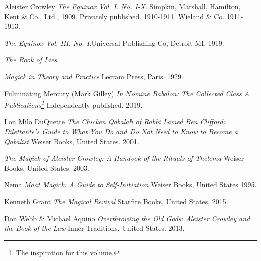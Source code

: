 \makeatletter
\renewcommand\@biblabel[1]{}
\makeatother
\renewcommand{\bibname}{Bibliography \& Additional Readings}
\begin{thebibliography}{10}
  Aleister Crowley
  \textit{The Equinox Vol. I. No. I-X}.\footnotemark
  Simpkin, Marshall, Hamilton, Kent \& Co., Ltd., 1909.
  Privately published. 1910-1911.
  Wieland \& Co. 1911-1913.

  \textemdash{}
  \textit{The Equinox Vol. III. No. I.}\footnotemark[\value{footnote}]
  Universal Publishing Co, Detroit MI. 1919.

  \textemdash{}
  \textit{The Book of Lies}.

  \textemdash{}
  \textit{Magick in Theory and Practice}\footnotemark[\value{footnote}]
  Lecram Press, Paris. 1929.


  Fulminating Mercury (Mark Gilley)
  \textit{In Nomine Babalon: The Collected Class A Publications\footnote{The inspiration for this volume.}}
  Independently published. 2019.

  Lon Milo DuQuette
  \textit{The Chicken Qabalah of Rabbi Lamed Ben Clifford: Dilettante's Guide to What You Do and Do Not Need to Know to Become a Qabalist}\footnotemark
  Weiser Books, United States. 2001.

  \textemdash{}
  \textit{The Magick of Aleister Crowley: A Handook of the Rituals of Thelema}\footnotemark[\value{footnote}]
  Weiser Books, United States. 2003.

  Nema
  \textit{Maat Magick: A Guide to Self-Initiation}
  Weiser Books, United States 1995.

  Kenneth Grant
  \textit{The Magical Revival}
  Starfire Books, United States, 2015.

  Don Webb \& Michael Aquino
  \textit{Overthrowing the Old Gods: Aleister Crowley and the Book of the Law}
  Inner Traditions, United States. 2013.
\end{thebibliography}
